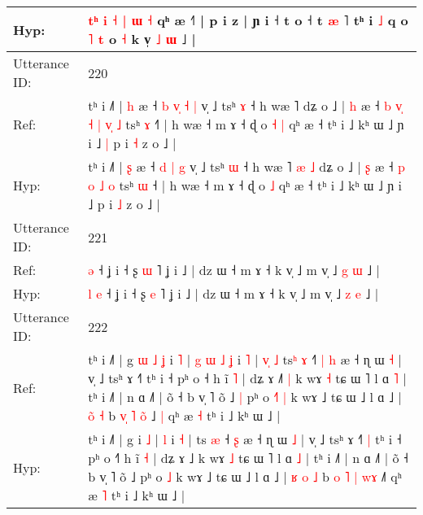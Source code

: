 \documentclass[10pt]{article}
\DeclareRobustCommand{\hl}[1]{{\textcolor{red}{#1}}}
\begin{document}
\begin{longtable}{ll}
 \\
Hyp: & \hl{t}\hl{ʰ} \hl{i} \hl{˧} \hl{|} \hl{ɯ} \hl{˧} qʰ æ ˧\hl{˥} | p i\hl{}\hl{} z\hl{}\hl{}\hl{}\hl{} | ɲ i ˧ t o\hl{}\hl{}\hl{}\hl{}\hl{}\hl{}\hl{}\hl{} ˧ t \hl{æ} \hl{}˥\hl{}\hl{} tʰ i \hl{˩} q o \hl{˥} \hl{t} o \hl{˧} k v̩\hl{ }\hl{˩}\hl{ }\hl{ɯ} ˩ |
 \\
\midrule
Utterance ID: & 220 \\
Ref: & tʰ i ˩˥ | \hl{h} æ ˧\hl{ }\hl{b} \hl{v}\hl{̩} \hl{˧} \hl{|} v̩ ˩ tsʰ \hl{ɤ} ˧ h wæ ˥\hl{}\hl{}\hl{}\hl{} dʑ o ˩ | \hl{h} æ ˧\hl{ }\hl{b}\hl{ }\hl{v}\hl{̩} \hl{˧} \hl{|} \hl{v}\hl{̩} \hl{˩} tsʰ \hl{ɤ} ˧\hl{˥} | h wæ ˧ m ɤ ˧ ɖ o\hl{ }\hl{˧} \hl{|} qʰ æ ˧ tʰ i ˩ kʰ ɯ ˩ ɲ i ˩\hl{ }\hl{|} p i \hl{˧} z o ˩ |
 \\
Hyp: & tʰ i ˩˥ | \hl{ʂ} æ ˧\hl{}\hl{} \hl{}\hl{d} \hl{|} \hl{g} v̩ ˩ tsʰ \hl{ɯ} ˧ h wæ ˥\hl{ }\hl{æ}\hl{ }\hl{˩} dʑ o ˩ | \hl{ʂ} æ ˧\hl{}\hl{}\hl{}\hl{}\hl{} \hl{p} \hl{o} \hl{}\hl{˩} \hl{o} tsʰ \hl{ɯ} ˧\hl{} | h wæ ˧ m ɤ ˧ ɖ o\hl{}\hl{} \hl{˩} qʰ æ ˧ tʰ i ˩ kʰ ɯ ˩ ɲ i ˩\hl{}\hl{} p i \hl{˩} z o ˩ |
 \\
\midrule
Utterance ID: & 221 \\
Ref: & \hl{}\hl{}\hl{ə} ˧ ʝ i ˧ ʂ \hl{ɯ} ˥ ʝ i ˩ | dz ɯ ˧ m ɤ ˧ k v̩ ˩ m v̩ ˩ \hl{g} \hl{ɯ} ˩ |
 \\
Hyp: & \hl{l}\hl{ }\hl{e} ˧ ʝ i ˧ ʂ \hl{e} ˥ ʝ i ˩ | dz ɯ ˧ m ɤ ˧ k v̩ ˩ m v̩ ˩ \hl{z} \hl{e} ˩ |
 \\
\midrule
Utterance ID: & 222 \\
Ref: & tʰ i ˩˥ | g\hl{ }\hl{ɯ}\hl{ }\hl{˩}\hl{ }\hl{ʝ} i \hl{˥} |\hl{ }\hl{g}\hl{ }\hl{ɯ}\hl{ }\hl{˩} \hl{ʝ} i \hl{˥} |\hl{ }\hl{v}\hl{̩}\hl{ }\hl{˩} ts\hl{ʰ} \hl{ɤ} ˧\hl{˥}\hl{ }\hl{|} \hl{h} æ ˧ ɳ ɯ \hl{˧} | v̩ ˩ tsʰ ɤ ˧˥\hl{}\hl{} tʰ i ˧ pʰ o ˧\hl{} h ĩ \hl{˥} | dʑ ɤ ˩\hl{˥}\hl{ }\hl{|} k wɤ \hl{˧} tɕ ɯ ˥ l ɑ \hl{˥} | tʰ i ˩˥ | n ɑ ˩˥ | õ ˧ b v̩ ˥ õ ˩\hl{ }\hl{|} pʰ o\hl{ }\hl{˧}\hl{˥} \hl{|} k wɤ ˩ tɕ ɯ ˩ l ɑ ˩ | \hl{}\hl{o}\hl{̃} \hl{˧} b \hl{}\hl{v}\hl{̩} \hl{˥} \hl{o}\hl{̃} ˩\hl{ }\hl{|} qʰ æ \hl{˧} tʰ i ˩ kʰ ɯ ˩ |
 \\
Hyp: & tʰ i ˩˥ | g\hl{}\hl{}\hl{}\hl{}\hl{}\hl{} i \hl{˩} |\hl{}\hl{}\hl{}\hl{}\hl{}\hl{} \hl{l} i \hl{˧} |\hl{}\hl{}\hl{}\hl{}\hl{} ts\hl{} \hl{æ} ˧\hl{}\hl{}\hl{} \hl{ʂ} æ ˧ ɳ ɯ \hl{˩} | v̩ ˩ tsʰ ɤ ˧˥\hl{ }\hl{|} tʰ i ˧ pʰ o ˧\hl{˥} h ĩ \hl{˧} | dʑ ɤ ˩\hl{}\hl{}\hl{} k wɤ \hl{˩} tɕ ɯ ˥ l ɑ \hl{˩} | tʰ i ˩˥ | n ɑ ˩˥ | õ ˧ b v̩ ˥ õ ˩\hl{}\hl{} pʰ o\hl{}\hl{}\hl{} \hl{˩} k wɤ ˩ tɕ ɯ ˩ l ɑ ˩ | \hl{ʁ}\hl{ }\hl{o} \hl{˩} b \hl{o}\hl{ }\hl{˥} \hl{|} \hl{w}\hl{ɤ} ˩\hl{}\hl{˥} qʰ æ \hl{˥} tʰ i ˩ kʰ ɯ ˩ |

\end{longtable}
\end{document}
